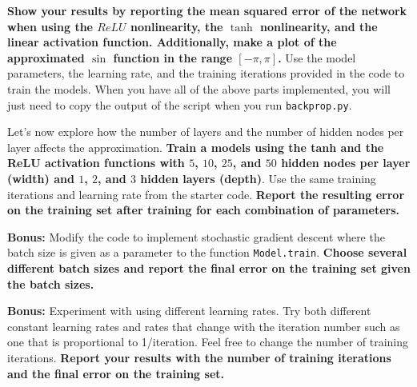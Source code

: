 \begin{Parts}
\Part \textbf{Show your results by reporting the mean squared error of the network when using the $ReLU$ nonlinearity, the $\tanh$ nonlinearity, and the linear activation function.  Additionally, make a plot of the approximated $\sin$ function in the range $[-\pi,\pi]$.}  Use the model parameters, the learning rate, and the training iterations provided in the code to train the models.  When you have all of the above parts implemented, you will just need to copy the output of the script when you run \texttt{backprop.py}.



\Part Let's now explore how the number of layers and the number of hidden nodes per layer affects the approximation.  \textbf{Train a models using the tanh and the ReLU activation functions with $5$, $10$, $25$, and $50$ hidden nodes per layer (width) and $1$, $2$, and $3$ hidden layers (depth)}.  Use the same training iterations and learning rate from the starter code.  \textbf{Report the resulting error on the training set after training for each combination of parameters.}




\Part \textbf{Bonus:} Modify the code to implement stochastic gradient descent where the batch size is given as a parameter to the function \texttt{Model.train}. \textbf{Choose several different batch sizes and report the final error on the training set given the batch sizes.}

\Part \textbf{Bonus:} Experiment with using different learning rates.  Try both different constant learning rates and rates that change with the iteration number such as one that is proportional to 1/iteration.  Feel free to change the number of training iterations.  \textbf{Report your results with the number of training iterations and the final error on the training set.}

\end{Parts}


